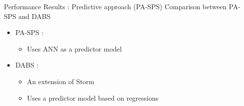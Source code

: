 %	

\begin{frame}{Performance Results : Predictive approach (PA-SPS)}
	Comparison between PA-SPS and DABS
	\begin{itemize}
		\item PA-SPS : 
		\begin{itemize}
			\item Uses ANN as a predictor model
		\end{itemize}
		\item DABS :
		\begin{itemize}
		 	\item An extension of Storm 
		 	\item Uses a predictor model based on regressions
		\end{itemize}
	\end{itemize}
\end{frame}

